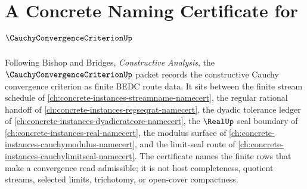 \chapter{A Concrete Naming Certificate for $\CauchyConvergenceCriterionUp$}
\label{ch:concrete-instances-cauchy-convergence-criterion-namecert}

Following Bishop and Bridges, \emph{Constructive Analysis}, the $\CauchyConvergenceCriterionUp$ packet records the constructive Cauchy convergence criterion as finite BEDC route data. It sits between the finite stream schedule of \autoref{ch:concrete-instances-streamname-namecert}, the regular rational handoff of \autoref{ch:concrete-instances-regseqrat-namecert}, the dyadic tolerance ledger of \autoref{ch:concrete-instances-dyadicratcore-namecert}, the $\RealUp$ seal boundary of \autoref{ch:concrete-instances-real-namecert}, the modulus surface of \autoref{ch:concrete-instances-cauchymodulus-namecert}, and the limit-seal route of \autoref{ch:concrete-instances-cauchylimitseal-namecert}. The certificate names the finite rows that make a convergence read admissible; it is not host completeness, quotient streams, selected limits, trichotomy, or open-cover compactness.


